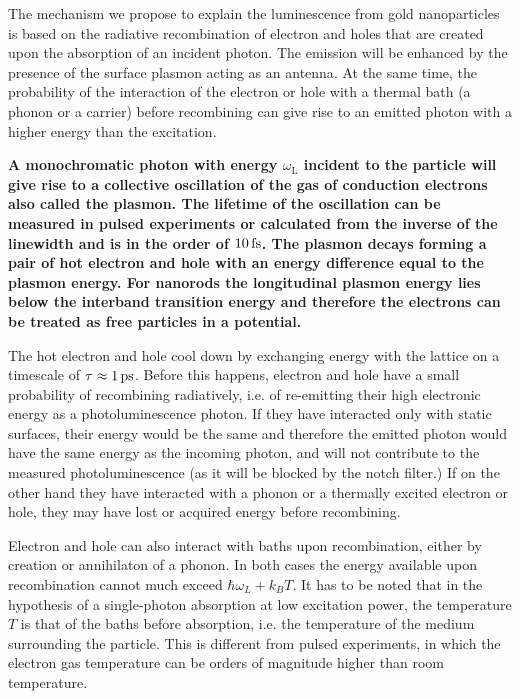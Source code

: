 The mechanism we propose to explain the luminescence from gold nanoparticles is
based on the radiative recombination of electron and holes that are created upon
the absorption of an incident photon\cite{Dulkeith2004,Mooradian1969}. The
emission will be enhanced by the presence of the surface plasmon acting as an
antenna\cite{Mohamed2000}. At the same time, the probability of the interaction
of the electron or hole with a thermal bath (a phonon or a carrier) before
recombining can give rise to an emitted photon with a higher energy than the
excitation\cite{Hodak2000,Giri2015,Arbouet2003a}.

\textbf{
A monochromatic photon with energy $\omega_\textrm{L}$ incident to the particle
will give rise to a collective oscillation of the gas of conduction electrons
also called the plasmon. The lifetime of the oscillation can be measured in
pulsed experiments or calculated from the inverse of the linewidth and is in the
order of $10\,\textrm{fs}$\cite{Sonnichsen2002}. The plasmon decays forming a pair of hot
electron and hole with an energy difference equal to the plasmon
energy\cite{Sundararaman2014,Brongersma2015}. For nanorods the longitudinal
plasmon energy lies below the interband transition energy and therefore the
electrons can be treated as free particles in a
potential\cite{AlejandroManjavacasJunG.LiuVikramKulkarni2014}.
}

The hot electron and hole cool down by exchanging energy with the lattice on a
timescale of $\tau\approx1\,\textrm{ps}$\cite{Pustovalov2005}. Before this happens,
electron and hole have a small probability of recombining radiatively, i.e. of 
re-emitting their high electronic energy as a photoluminescence photon. If they
have interacted only with static surfaces, their energy would be the same and
therefore the emitted photon would have the same energy as the incoming
photon, and will not contribute to the measured photoluminescence (as it will be
blocked by the notch filter.) If on the other hand they have interacted with a
phonon or a thermally excited electron or hole, they may have lost or acquired
energy before recombining.

Electron and hole can also interact with baths upon recombination, either by
creation or annihilaton of a phonon. In both cases the energy available upon
recombination cannot much exceed $\hbar\omega_L+k_BT$. It has to be noted that
in the hypothesis of a single-photon absorption at low excitation power, the
temperature $T$ is that of the baths before absorption, i.e. the temperature of
the medium surrounding the particle. This is different from pulsed experiments,
in which the electron gas temperature can be orders of magnitude higher than
room temperature\cite{Baffou2013a}. 

